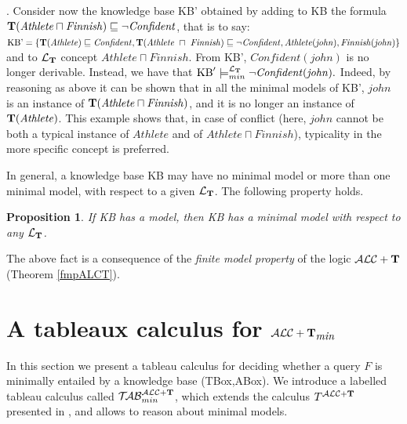 \documentclass[a4paper, 11pt, oneside]{duthesis}
\newcommand{\tip}{{\bf T}}
\newcommand{\alct}{\mathcal{ALC}+\tip}
\newcommand{\alctmin}{\mathcal{ALC}+\tip_{\mbox{\em min}}}
\newcommand{\sqset}{\sqsubseteq}
\newcommand{\mint}{\sqcap}
\newcommand{\ellet} {\mathcal{L}_{\bf T}}
\newcommand{\nuovoc}{\mathrel{{\mathcal{T}\!\mathcal{AB}}}_{min}^{\mathcal{ALC}+\mbox{\scriptsize $\tip$}}}
\newcommand{\calcolo}{T^{\mathcal{ALC}+\mbox{\scriptsize $\tip$}}}
\newtheorem{proposition}{Proposition}
\newcounter{posu}
\newtheorem{proposition}[posu]{Proposition}
\begin{document}
. Consider now the knowledge base KB' obtained by adding to KB the formula $\tip(\mathit{Athlete} \mint \mathit{Finnish}) \sqsubseteq \neg \mathit{Confident}$, that is to say:
$\mbox{KB'}  = \{ \tip(\mathit{Athlete}) \sqset \mathit{Confident}, \tip(\mathit{Athlete} \ \mint \ \mathit{Finnish}) \sqsubseteq \neg \mathit{Confident}, \mathit{Athlete}(\mathit{john}), \mathit{Finnish}(\mathit{john})\}$ and to ${\ellet}$ concept $\mathit{Athlete} \mint \mathit{Finnish}$.
From KB', $\mathit{Confident}(\mathit{john})$ is no longer derivable.
Instead, we have that $\mbox{KB}' \models_{min}^{\ellet} \neg \mathit{Confident}(\mathit{john}).$ Indeed, by reasoning as above it can be shown that in all the minimal models of KB', $\mathit{john}$ is an instance of $\tip(\mathit{Athlete} \mint \mathit{Finnish})$, and it is no longer an instance of $\tip(\mathit{Athlete})$.
This example shows that, in case of conflict (here, $\mathit{john}$ cannot be both a typical instance of $\mathit{Athlete}$ and of $\mathit{Athlete} \mint \mathit{Finnish}$), typicality in the more specific concept is preferred.

\vspace{0.35cm}

\noindent In general, a knowledge base KB may have no minimal model or more than one minimal model, with respect to a given $\ellet$. The following property holds.

\begin{proposition}\label{proprModMinimali1}
If \emph{KB} has a model, then \emph{KB} has a minimal model with respect to any $\ellet$.
\end{proposition}

The above fact  is  a consequence of the \emph{finite model property} of the logic $\alct$ (Theorem \ref{fmpALCT}).




\chapter{A tableaux calculus for $\alctmin$}\label{tab}

In this section we present a tableau calculus for deciding whether a query $F$ is minimally entailed by a knowledge base (TBox,ABox).
We introduce a labelled tableau calculus  called $\nuovoc$, which extends the calculus $\calcolo$ presented in \cite{FI09}, and allows to reason about minimal models.
\end{document}
